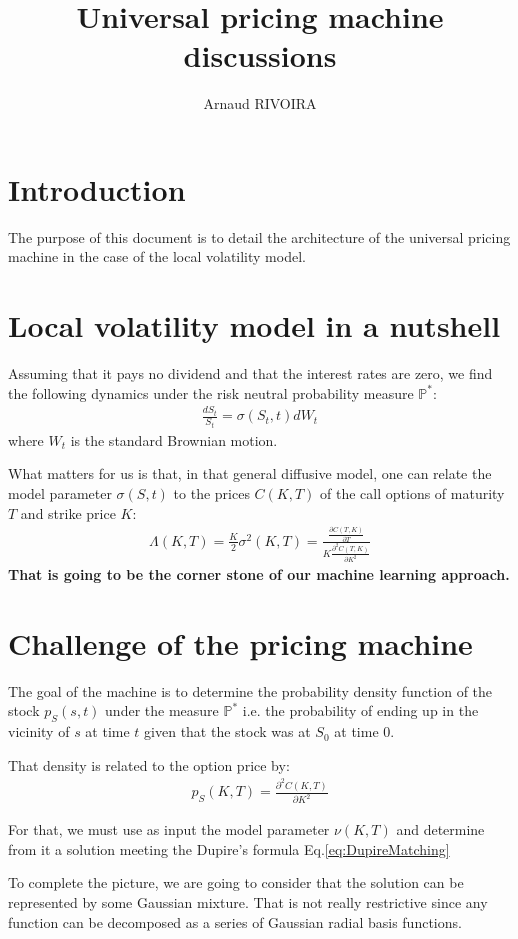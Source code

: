 \documentclass[10pt,a4paper]{article}
\author{Arnaud RIVOIRA}
\title{Universal pricing machine discussions}
\begin{document}
\section{Introduction}
The purpose of this document is to detail the architecture of the universal pricing machine in the case of the local volatility model.

\section{Local volatility model in a nutshell}
Assuming that it pays no dividend and that the interest rates are zero, we find the following dynamics under the risk neutral probability measure $\mathbb{P}^*$:
\begin{align}
\frac{dS_t}{S_t} = \sigma(S_t,t) dW_t
\end{align}
where $W_t$ is the standard Brownian motion.

What matters for us is that, in that general diffusive model, one can relate the model parameter $\sigma(S,t)$ to the prices $C(K,T)$ of the call options of maturity $T$ and strike price $K$:
\begin{align}\label{eq:DupireMatching}
\Lambda(K,T) = \frac{K}{2}\sigma^2(K,T) = \frac{\frac{\partial C(T,K)}{\partial T}}{K\frac{\partial^2 C(T,K)}{\partial K^2}}
\end{align}
\textbf{That is going to be the corner stone of our machine learning approach.}

\section{Challenge of the pricing machine}
The goal of the machine is to determine the probability density function of the stock $p_S(s,t)$ under the measure $\mathbb{P}^*$ i.e. the probability of ending up in the vicinity of $s$ at time $t$ given that the stock was at $S_0$ at time 0.

That density is related to the option price by:
\begin{align}
p_S(K,T) = \frac{\partial^2 C(K,T)}{\partial K^2}
\end{align}

For that, we must use as input the model parameter $\nu(K,T)$ and determine from it a solution meeting the Dupire's formula Eq.\ref{eq:DupireMatching}

To complete the picture, we are going to consider that the solution can be represented by some Gaussian mixture. That is not really restrictive since any function can be decomposed as a series of Gaussian radial basis functions. 
\end{document}
